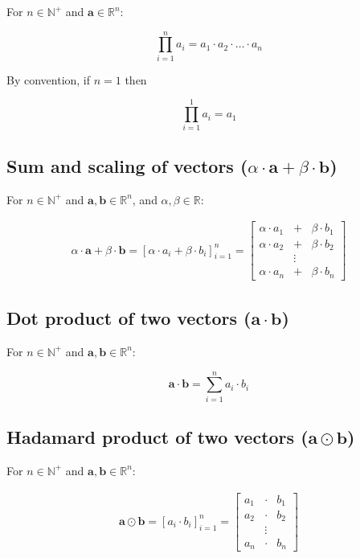 \documentclass[titlepage]{article}
\begin{document}
        For $n \in \mathbb{N}^+$ and $\mathbf{a} \in \mathbb{R}^n$:

        $$\prod_{i=1}^n a_i = a_1 \cdot a_2 \cdot \ldots \cdot a_n$$

        By convention, if $n=1$ then

        $$\prod_{i=1}^1 a_i = a_1$$

      \subsection{%
        Sum and scaling of vectors
        ($\alpha \cdot \mathbf{a} + \beta \cdot \mathbf{b}$)
      }

        For $n \in \mathbb{N}^+$ and $\mathbf{a}, \mathbf{b} \in \mathbb{R}^n$,
        and $\alpha, \beta \in \mathbb{R}$:

        \begin{align*}
          \alpha \cdot \mathbf{a} + \beta \cdot \mathbf{b}
            = \left[ \alpha \cdot a_i + \beta \cdot b_i \right]_{i=1}^n
            = \begin{bmatrix}
                \alpha \cdot a_1 & + & \beta \cdot b_1 \\
                \alpha \cdot a_2 & + & \beta \cdot b_2 \\
                & \vdots & \\
                \alpha \cdot a_n & + & \beta \cdot b_n
              \end{bmatrix}
        \end{align*}

      \subsection{Dot product of two vectors ($\mathbf{a} \cdot \mathbf{b}$)}

        For $n \in \mathbb{N}^+$ and $\mathbf{a}, \mathbf{b} \in \mathbb{R}^n$:

        $$\mathbf{a} \cdot \mathbf{b} = \sum_{i=1}^n a_i \cdot b_i$$

      \subsection{%
        Hadamard product of two vectors ($\mathbf{a} \odot \mathbf{b}$)
      }

        For $n \in \mathbb{N}^+$ and $\mathbf{a}, \mathbf{b} \in \mathbb{R}^n$:

        \begin{align*}
          \mathbf{a} \odot \mathbf{b}
            = \left[ a_i \cdot b_i \right]_{i=1}^n
            = \begin{bmatrix}
                a_1 & \cdot & b_1 \\
                a_2 & \cdot & b_2 \\
                & \vdots & \\
                a_n & \cdot & b_n
              \end{bmatrix}
        \end{align*}
\end{document}
